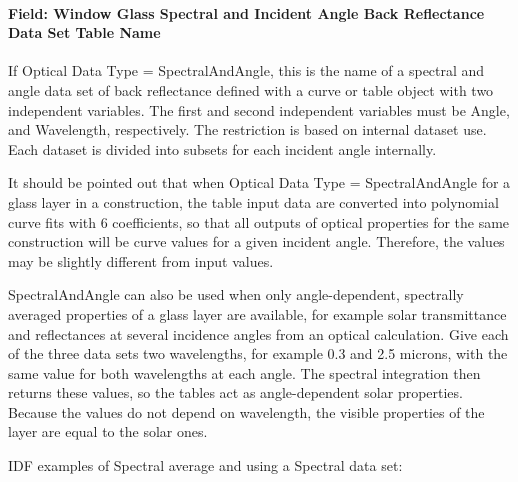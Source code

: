 \paragraph{Field: Window Glass Spectral and Incident Angle Back Reflectance Data Set Table Name}\label{field-window-glass-spectral-and-incident-angle-back-reflectance-data}

If Optical Data Type = SpectralAndAngle, this is the name of a spectral and angle data set of back reflectance defined with a curve or table object with two independent variables. The first and second independent variables must be Angle, and Wavelength, respectively. The restriction is based on internal dataset use. Each dataset is divided into subsets for each incident angle internally.

It should be pointed out that when Optical Data Type = SpectralAndAngle for a glass layer in a construction, the table input data are converted into polynomial curve fits with 6 coefficients, so that all outputs of optical properties for the same construction will be curve values for a given incident angle. Therefore, the values may be slightly different from input values.

SpectralAndAngle can also be used when only angle-dependent, spectrally averaged properties of a glass layer are available, for example solar transmittance and reflectances at several incidence angles from an optical calculation. Give each of the three data sets two wavelengths, for example 0.3 and 2.5 microns, with the same value for both wavelengths at each angle. The spectral integration then returns these values, so the tables act as angle-dependent solar properties. Because the values do not depend on wavelength, the visible properties of the layer are equal to the solar ones.

IDF examples of Spectral average and using a Spectral data set:

